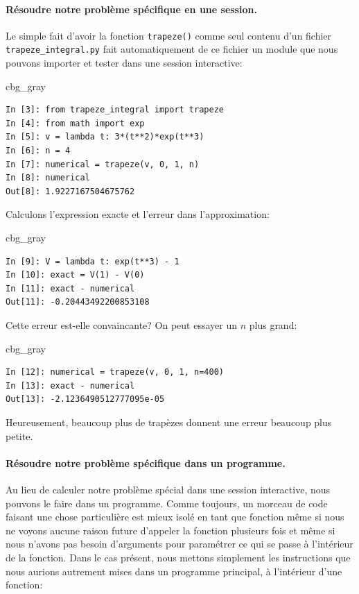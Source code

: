 \documentclass[%
oneside,                 %
final,                   %
10pt]{article}
\newenvironment{_cod_tight}[1]{
   \def\FrameCommand{\colorbox{#1}}
   \FrameRule0.6pt\MakeFramed {\FrameRestore}\vskip3mm}
   {\vskip0mm\endMakeFramed}
\newenvironment{cod}[1]{
\bgroup\rmfamily
\fboxsep=0mm\relax
\begin{_cod_tight}{#1}
\list{}{\parsep=-2mm\parskip=0mm\topsep=0pt\leftmargin=2mm
\rightmargin=2\leftmargin\leftmargin=4pt\relax}
\item\relax}
{\endlist\end{_cod_tight}\egroup}
\begin{document}
\paragraph{Résoudre notre problème spécifique en une session.}
Le simple fait d'avoir la fonction \texttt{trapeze()} comme seul contenu d'un fichier \Verb!trapeze_integral.py! fait automatiquement de ce fichier un module que nous pouvons importer et tester dans une session interactive:
\begin{cod}{cbg_gray}\begin{verbatim}
In [3]: from trapeze_integral import trapeze
In [4]: from math import exp
In [5]: v = lambda t: 3*(t**2)*exp(t**3)
In [6]: n = 4
In [7]: numerical = trapeze(v, 0, 1, n)
In [8]: numerical
Out[8]: 1.9227167504675762
\end{verbatim}
\end{cod}
\noindent
Calculons l'expression exacte et l'erreur dans l'approximation:
\begin{cod}{cbg_gray}\begin{verbatim}
In [9]: V = lambda t: exp(t**3) - 1
In [10]: exact = V(1) - V(0)
In [11]: exact - numerical
Out[11]: -0.20443492200853108
\end{verbatim}
\end{cod}
\noindent
Cette erreur est-elle convaincante? On peut essayer un $n$ plus grand:
\begin{cod}{cbg_gray}\begin{verbatim}
In [12]: numerical = trapeze(v, 0, 1, n=400)
In [13]: exact - numerical
Out[13]: -2.1236490512777095e-05
\end{verbatim}
\end{cod}
\noindent
Heureusement, beaucoup plus de trapèzes donnent une erreur beaucoup plus petite.
\paragraph{Résoudre notre problème spécifique dans un programme.}
Au lieu de calculer notre problème spécial dans une session interactive, nous pouvons le faire dans un programme. Comme toujours, un morceau de code faisant une chose particulière est mieux isolé en tant que fonction même si nous ne voyons aucune raison future d'appeler la fonction plusieurs fois et même si nous n'avons pas besoin d'arguments pour paramétrer ce qui se passe à l'intérieur de la fonction. Dans le cas présent, nous mettons simplement les instructions que nous aurions autrement mises dans un programme principal, à l'intérieur d'une fonction:
\end{document}
